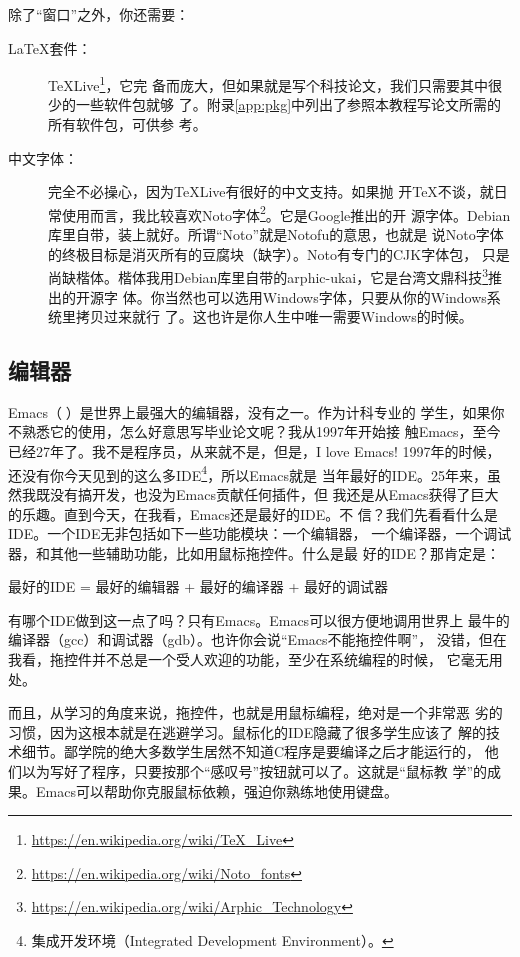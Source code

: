 除了“窗口”之外，你还需要：
\begin{description}
\item[\LaTeX{}套件：]
  \TeX{}Live\footnote{\url{https://en.wikipedia.org/wiki/TeX_Live}}，它完
  备而庞大，但如果就是写个科技论文，我们只需要其中很少的一些软件包就够
  了。附录\ref{app:pkg}中列出了参照本教程写论文所需的所有软件包，可供参
  考。
\item[中文字体：] 完全不必操心，因为\TeX{}Live有很好的中文支持。如果抛
  开\TeX{}不谈，就日常使用而言，我比较喜欢Noto字体\footnote{%
    \url{https://en.wikipedia.org/wiki/Noto_fonts}}。它是Google推出的开
  源字体。Debian库里自带，装上就好。所谓“Noto”就是Notofu的意思，也就是
  说Noto字体的终极目标是消灭所有的豆腐块（缺字）。Noto有专门的CJK字体包，
  只是尚缺楷体。楷体我用Debian库里自带的arphic-ukai，它是台湾文鼎科技\footnote{%
    \url{https://en.wikipedia.org/wiki/Arphic_Technology}}推出的开源字
  体。你当然也可以选用Windows字体，只要从你的Windows系统里拷贝过来就行
  了。这也许是你人生中唯一需要Windows的时候。
\end{description}

\subsection{编辑器}
\label{sec:emacs}

Emacs（）是世界上最强大的编辑器\cite{emacs}，没有之一。作为计科专业的
学生，如果你不熟悉它的使用，怎么好意思写毕业论文呢？我从1997年开始接
触Emacs，至今已经27年了。我不是程序员，从来就不是，但是，I love Emacs!
1997年的时候，还没有你今天见到的这么多IDE\footnote{%
  集成开发环境（Integrated Development Environment）。}，所以Emacs就是
当年最好的IDE。25年来，虽然我既没有搞开发，也没为Emacs贡献任何插件，但
我还是从Emacs获得了巨大的乐趣。直到今天，在我看，Emacs还是最好的IDE。不
信？我们先看看什么是IDE。一个IDE无非包括如下一些功能模块：一个编辑器，
一个编译器，一个调试器，和其他一些辅助功能，比如用鼠标拖控件。什么是最
好的IDE？那肯定是：
\begin{center}
  最好的IDE = 最好的编辑器 + 最好的编译器 + 最好的调试器
\end{center}
有哪个IDE做到这一点了吗？只有Emacs。Emacs可以很方便地调用世界上
最牛的编译器（gcc）和调试器（gdb）。也许你会说“Emacs不能拖控件啊”，
没错，但在我看，拖控件并不总是一个受人欢迎的功能，至少在系统编程的时候，
它毫无用处。

而且，从学习的角度来说，拖控件，也就是用鼠标编程，绝对是一个非常恶
劣的习惯，因为这根本就是在逃避学习。鼠标化的IDE隐藏了很多学生应该了
解的技术细节。鄙学院的绝大多数学生居然不知道C程序是要编译之后才能运行的，
他们以为写好了程序，只要按那个“感叹号”按钮就可以了。这就是“鼠标教
学”的成果。Emacs可以帮助你克服鼠标依赖，强迫你熟练地使用键盘。

